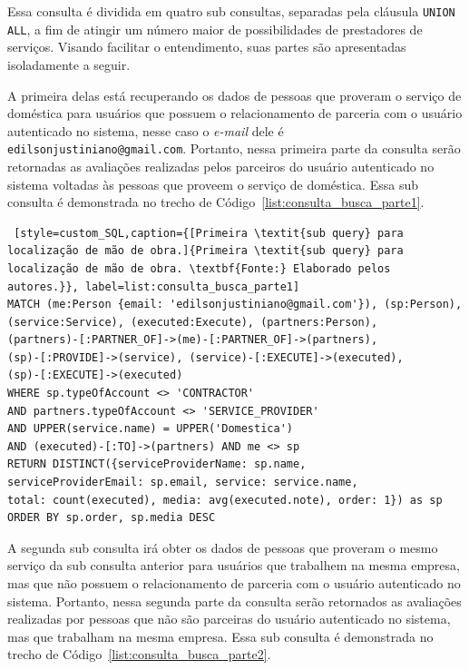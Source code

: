 Essa consulta é dividida em quatro sub consultas, separadas pela cláusula \texttt{UNION ALL}, a fim de atingir um número maior de possibilidades de prestadores de serviços. Visando facilitar o entendimento, suas partes são apresentadas isoladamente a seguir.

A primeira delas está recuperando os dados de pessoas que proveram o serviço de doméstica para usuários que possuem o relacionamento de parceria com o usuário autenticado no sistema, nesse caso o \textit{e-mail} dele é \texttt{edilsonjustiniano@gmail.com}. Portanto, nessa primeira parte da consulta serão retornadas as avaliações realizadas pelos parceiros do usuário autenticado no sistema voltadas às pessoas que proveem o serviço de doméstica. Essa sub consulta é demonstrada no trecho de Código~\ref{list:consulta_busca_parte1}.

\begin{lstlisting} [style=custom_SQL,caption={[Primeira \textit{sub query} para localização de mão de obra.]{Primeira \textit{sub query} para localização de mão de obra. \textbf{Fonte:} Elaborado pelos autores.}}, label=list:consulta_busca_parte1] 	
MATCH (me:Person {email: 'edilsonjustiniano@gmail.com'}), (sp:Person), 
(service:Service), (executed:Execute), (partners:Person), 
(partners)-[:PARTNER_OF]->(me)-[:PARTNER_OF]->(partners),
(sp)-[:PROVIDE]->(service), (service)-[:EXECUTE]->(executed),
(sp)-[:EXECUTE]->(executed)
WHERE sp.typeOfAccount <> 'CONTRACTOR' 
AND partners.typeOfAccount <> 'SERVICE_PROVIDER'
AND UPPER(service.name) = UPPER('Domestica')
AND (executed)-[:TO]->(partners) AND me <> sp
RETURN DISTINCT({serviceProviderName: sp.name, 
serviceProviderEmail: sp.email, service: service.name,
total: count(executed), media: avg(executed.note), order: 1}) as sp 
ORDER BY sp.order, sp.media DESC
\end{lstlisting}

A segunda sub consulta irá obter os dados de pessoas que proveram o mesmo serviço da sub consulta anterior para usuários que trabalhem na mesma empresa, mas que não possuem o relacionamento de parceria com o usuário autenticado no sistema. Portanto, nessa segunda parte da consulta serão retornados as avaliações realizadas por pessoas que não são parceiras do usuário autenticado no sistema, mas que trabalham na mesma empresa. Essa sub consulta é demonstrada no trecho de Código~\ref{list:consulta_busca_parte2}.

